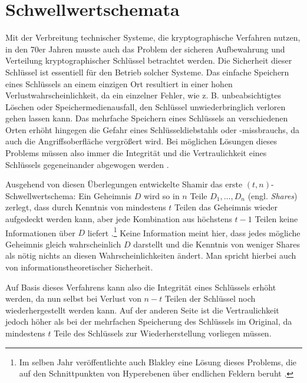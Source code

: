\section{Schwellwertschemata}

\label{sec_basics_threshold}


Mit der Verbreitung technischer Systeme, die kryptographische Verfahren nutzen, in den 70er Jahren musste auch das Problem der sicheren Aufbewahrung und Verteilung kryptographischer Schlüssel betrachtet werden. Die Sicherheit dieser Schlüssel ist essentiell für den Betrieb solcher Systeme. Das einfache Speichern eines Schlüssels an einem einzigen Ort resultiert in einer hohen Verlustwahrscheinlichkeit, da ein einzelner Fehler, wie z. B. unbeabsichtigtes Löschen oder Speichermedienausfall, den Schlüssel unwiederbringlich verloren gehen lassen kann. Das mehrfache Speichern eines Schlüssels an verschiedenen Orten erhöht hingegen die Gefahr eines Schlüsseldiebstahls oder -missbrauchs, da auch die Angriffsoberfläche vergrößert wird. Bei möglichen Lösungen dieses Problems müssen also immer die Integrität und die Vertraulichkeit eines Schlüssels gegeneinander abgewogen werden \cite{gemmell1997}.

Ausgehend von diesen Überlegungen entwickelte Shamir das erste \((t,n)\)-Schwellwertschema: Ein Geheimnis \(D\) wird so in \(n\) Teile \(D_1, \dots, D_n\) (engl. \textit{Shares}) zerlegt, dass durch Kenntnis von mindestens \(t\) Teilen das Geheimnis wieder aufgedeckt werden kann, aber jede Kombination aus höchstens \(t-1\) Teilen keine Informationen über \(D\) liefert \cite{shamir1979}.\footnote{
  Im selben Jahr veröffentlichte auch Blakley eine Lösung dieses Problems, die auf den Schnittpunkten von Hyperebenen über endlichen Feldern beruht \cite{blakley1979}.
} Keine Information meint hier, dass jedes mögliche Geheimnis gleich wahrscheinlich \(D\) darstellt und die Kenntnis von weniger Shares als nötig nichts an diesen Wahrscheinlichkeiten ändert. Man spricht hierbei auch von informationstheoretischer Sicherheit.

Auf Basis dieses Verfahrens kann also die Integrität eines Schlüssels erhöht werden, da nun selbst bei Verlust von \(n-t\) Teilen der Schlüssel noch wiederhergestellt werden kann. Auf der anderen Seite ist die Vertraulichkeit jedoch höher als bei der mehrfachen Speicherung des Schlüssels im Original, da mindestens \(t\) Teile des Schlüssels zur Wiederherstellung vorliegen müssen.

